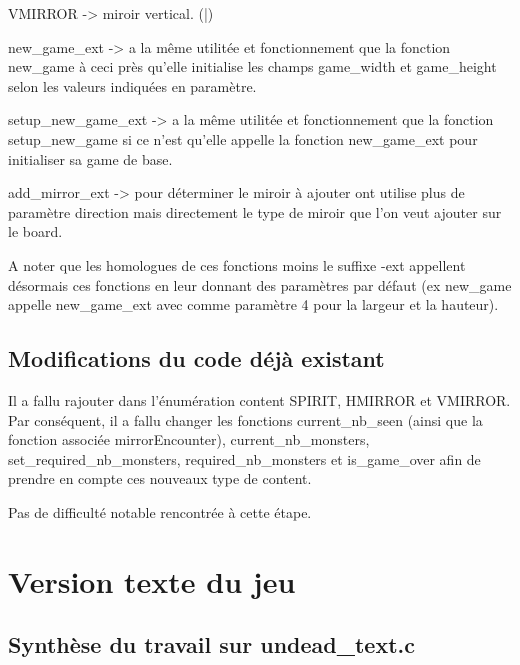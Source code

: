 \documentclass[12]{article}
\begin{document}
VMIRROR -> miroir vertical. (|)

new\_game\_ext -> a la même utilitée et fonctionnement que la fonction new\_game à ceci près qu'elle initialise les champs game\_width et game\_height selon les valeurs indiquées en paramètre.

setup\_new\_game\_ext -> a la même utilitée et fonctionnement que la fonction setup\_new\_game si ce n'est qu'elle appelle la fonction new\_game\_ext pour initialiser sa game de base.

add\_mirror\_ext -> pour déterminer le miroir à ajouter ont utilise plus de paramètre direction mais directement le type de miroir que l'on veut ajouter sur le board.

A noter que les homologues de ces fonctions moins le suffixe -ext appellent désormais ces fonctions en leur donnant des paramètres par défaut (ex new\_game appelle new\_game\_ext avec comme paramètre 4 pour la largeur et la hauteur).
\subsection{Modifications du code déjà existant}
Il a fallu rajouter dans l'énumération content SPIRIT, HMIRROR et VMIRROR.
Par conséquent, il a fallu changer les fonctions current\_nb\_seen (ainsi que la fonction associée mirrorEncounter), current\_nb\_monsters, set\_required\_nb\_monsters, required\_nb\_monsters et is\_game\_over afin de prendre en compte ces nouveaux type de content.


Pas de difficulté notable rencontrée à cette étape.
\section{Version texte du jeu}
\subsection{Synthèse du travail sur undead\_text.c}
\end{document}
